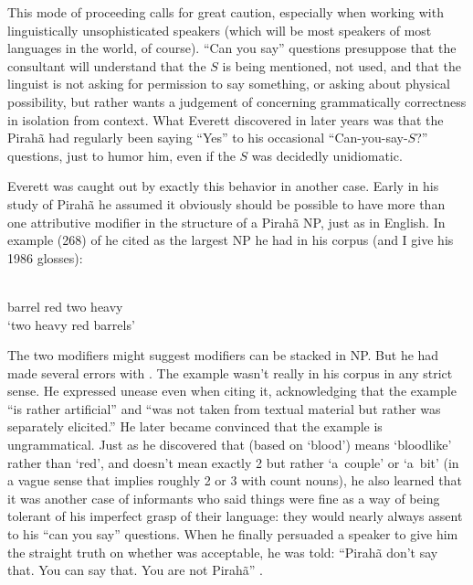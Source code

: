 \documentclass[output=paper,colorlinks,citecolor=brown
]{langscibook}
\begin{document}
This mode of proceeding calls for great caution, especially when
working with linguistically unsophisticated speakers (which will be
most speakers of most languages in the world, of course). ``Can you say''
questions presuppose that the consultant will understand that the $S$
is being mentioned, not used, and that the linguist is not asking
for permission to say something, or asking about physical possibility,
but rather wants a judgement of concerning grammatically correctness
in isolation from context. What Everett discovered in later years was
that the Pirah{\~a} had regularly been saying ``Yes'' to his occasional
``Can-you-say-$S$?'' questions, just to humor him, even if the $S$ was
decidedly unidiomatic.

Everett was caught out by exactly this behavior in another case. Early
in his study of Pirah{\~a} he assumed it obviously should be possible
to have more than one attributive modifier in the structure of a
Pirah{\~a} NP, just as in English. In example (268) of \citet[273]{Everett86HAL} he cited  as the largest NP he had
in his corpus (and I give his 1986 glosses):

\ea\label{ex:pullum:4}
\gll {}     
      \\
     barrel   red   two   heavy \\
     \glt `two heavy red barrels'
\z

\noindent
The two modifiers might suggest modifiers can be stacked in NP. But
he had made several errors with . The example wasn't really in
his corpus in any strict sense. He expressed unease even when citing
it, acknowledging that the example ``is rather artificial'' and ``was
not taken from textual material but rather was separately elicited.''
He later became convinced that the example is ungrammatical. Just
as he discovered that  (based on 
`blood') means `bloodlike' rather than `red', and 
doesn't mean exactly 2 but rather `a~couple' or `a~bit' (in a vague
sense that implies roughly 2 or 3 with count nouns), he also learned
that it was another case of informants who said things were fine as
a way of being tolerant of his imperfect grasp of their language:
they would nearly always assent to his ``can you say'' questions. When
he finally persuaded a speaker to give him the straight truth on
whether  was acceptable, he was told: ``Pirah{\~a} don't say that.
You can say that. You are not Pirah{\~a}'' \citep[422]{Everett09}.
\end{document}

